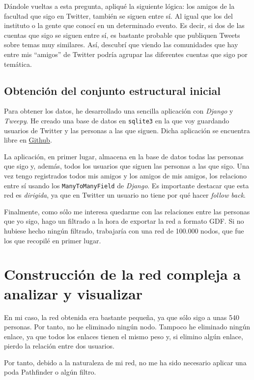 \documentclass[10pt,a4paper,spanish]{article}
\numberwithin{equation}{section} %
\numberwithin{figure}{section} %
\numberwithin{table}{section} %
\begin{document}
Dándole vueltas a esta pregunta, apliqué la siguiente lógica: los amigos de la facultad que sigo en Twitter, también se siguen entre sí. Al igual que los del instituto o la gente que conocí en un determinado evento. Es decir, si dos de las cuentas que sigo se siguen entre sí, es bastante probable que publiquen Tweets sobre temas muy similares. Así, descubrí que viendo las comunidades que hay entre mis ``amigos'' de Twitter podría agrupar las diferentes cuentas que sigo por temática.

\subsection{Obtención del conjunto estructural inicial}
Para obtener los datos, he desarrollado una sencilla aplicación con \textit{Django} y \textit{Tweepy}. He creado una base de datos en \texttt{sqlite3} en la que voy guardando usuarios de Twitter y las personas a las que siguen. Dicha aplicación se encuentra libre en \href{https://github.com/mgmacias95/TwitterFriends}{Github}.

La aplicación, en primer lugar, almacena en la base de datos todas las personas que sigo y, además, todos los usuarios que siguen las personas a las que sigo. Una vez tengo registrados todos mis amigos y los amigos de mis amigos, los relaciono entre sí usando los \texttt{ManyToManyField} de \textit{Django}. Es importante destacar que esta red es \textit{dirigida}, ya que en Twitter un usuario no tiene por qué hacer \textit{follow back}.

Finalmente, como sólo me interesa quedarme con las relaciones entre las personas que yo sigo, hago un filtrado a la hora de exportar la red a formato GDF. Si no hubiese hecho ningún filtrado, trabajaría con una red de 100.000 nodos, que fue los que recopilé en primer lugar.

\section{Construcción de la red compleja a analizar y visualizar}
En mi caso, la red obtenida era bastante pequeña, ya que sólo sigo a unas 540 personas. Por tanto, no he eliminado ningún nodo. Tampoco he eliminado ningún enlace, ya que todos los enlaces tienen el mismo peso y, si elimino algún enlace, pierdo la relación entre dos usuarios. 

Por tanto, debido a la naturaleza de mi red, no me ha sido necesario aplicar una poda Pathfinder o algún filtro.
\end{document}
